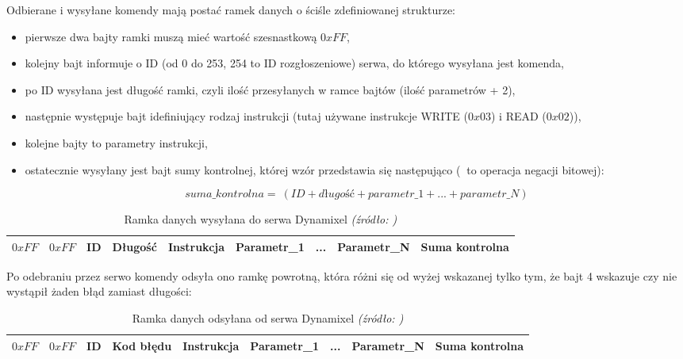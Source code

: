 \documentclass[a4paper, 12pt, twoside]{article}
\begin{document}
Odbierane i wysyłane komendy mają postać ramek danych o ściśle zdefiniowanej strukturze:

\begin{itemize}
\item pierwsze dwa bajty ramki muszą mieć wartość szesnastkową $0xFF$,
\item kolejny bajt informuje o ID (od 0 do 253, 254 to ID rozgłoszeniowe) serwa, do którego wysyłana jest komenda,
\item po ID wysyłana jest długość ramki, czyli ilość przesyłanych w ramce bajtów (ilość parametrów + 2),
\item następnie występuje bajt idefiniujący rodzaj instrukcji (tutaj używane instrukcje WRITE ($0x03$) i READ ($0x02$)),
\item kolejne bajty to parametry instrukcji,
\item ostatecznie wysyłany jest bajt sumy kontrolnej, której wzór przedstawia się następująco ($~$ to operacja negacji bitowej):

\begin{equation} \label{eq:9}
suma\_kontrolna = ~(ID + długość + parametr\_1 + ... + parametr\_N)
\end{equation}

\end{itemize}

\begin{table}[htb!]
\label{protocol}
\begin{center}
\caption{Ramka danych wysyłana do serwa Dynamixel \textit{(źródło: \cite{protocol})}}
\begin{tabular}{ | c | c | c | c | c | c | c | c | c | }
\hline
 $0xFF$ & $0xFF$ & ID & Długość & Instrukcja & Parametr\_1 & ... & Parametr\_N & Suma kontrolna \\ 
\hline
\end{tabular}
\end{center}
\end{table}

Po odebraniu przez serwo komendy odsyła ono ramkę powrotną, która różni się od wyżej wskazanej tylko tym, że bajt 4 wskazuje czy nie wystąpił żaden błąd zamiast długości:

\begin{table}[htb!]
\label{protocol}
\begin{center}
\caption{Ramka danych odsyłana od serwa Dynamixel \textit{(źródło: \cite{protocol})}}
\begin{tabular}{ | c | c | c | c | c | c | c | c | c | }
\hline
 $0xFF$ & $0xFF$ & ID & Kod błędu & Instrukcja & Parametr\_1 & ... & Parametr\_N & Suma kontrolna \\ 
\hline
\end{tabular}
\end{center}
\end{table}
\end{document}
